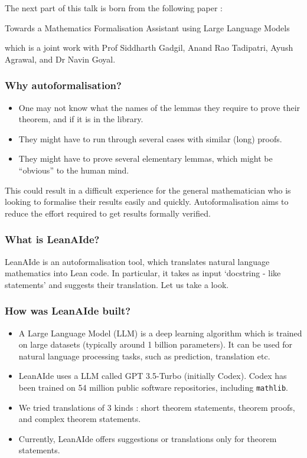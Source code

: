 \documentclass{beamer} %
\begin{document}
\begin{frame}
The next part of this talk is born from the following paper :
\begin{center}
Towards a Mathematics Formalisation Assistant using Large Language Models
\end{center}
which is a joint work with Prof Siddharth Gadgil, Anand Rao Tadipatri, Ayush Agrawal, and Dr Navin Goyal.
\end{frame}
\begin{frame}
\frametitle{Why autoformalisation?}
\begin{itemize}
\item [\textbullet] One may not know what the names of the lemmas they require to prove their theorem, and if it is in the library. \pause
\item [\textbullet] They might have to run through several cases with similar (long) proofs. \pause
\item [\textbullet] They might have to prove several elementary lemmas, which might be ``obvious'' to the human mind. \pause
\end{itemize}
This could result in a difficult experience for the general mathematician who is looking to formalise their results easily and quickly. Autoformalisation aims to reduce the effort required to get results formally verified.
\end{frame}
\begin{frame}
\frametitle{What is LeanAIde?}
LeanAIde is an autoformalisation tool, which translates natural language mathematics into Lean code. \pause \newline
In particular, it takes as input `docstring - like statements' and suggests their translation. \pause \newline 
Let us take a look.
\end{frame}
\begin{frame}
\frametitle{How was LeanAIde built?}
\begin{itemize}
\item [\textbullet] A Large Language Model (LLM) is a deep learning algorithm which is trained on large datasets (typically around 1 billion parameters). It can be used for natural language processing tasks, such as prediction, translation etc. \pause
\item [\textbullet] LeanAIde uses a LLM called GPT 3.5-Turbo (initially Codex). Codex has been trained on 54 million public software repositories, including \texttt{mathlib}. \pause
\item [\textbullet] We tried translations of 3 kinds : short theorem statements, theorem proofs, and complex theorem statements. \pause
\item [\textbullet] Currently, LeanAIde offers suggestions or translations only for theorem statements.
\end{itemize}
\end{frame}
\end{document}
